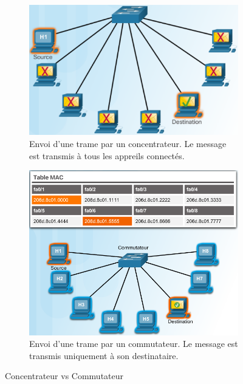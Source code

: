 \begin{figure}[p]
\centering
\begin{subfigure}{\textwidth}
\centering
  \includegraphics[width=.7\linewidth]{images/ethernet/concentrateurCroped}
  \caption{Envoi d'une trame par un concentrateur. Le message est transmis à tous les appreils connectés.}
  \label{fig:trameConcentrateur}
\end{subfigure}

\vspace{1cm}

  \begin{subfigure}{\textwidth}
  \centering
  \includegraphics[width=.7\linewidth]{images/ethernet/communtateur}
  \caption{Envoi d'une trame par un commutateur. Le message est transmis uniquement à son destinataire.}
  \label{fig:trameCommutateur}
  \end{subfigure}
  \caption{Concentrateur vs Commutateur}
\end{figure}
